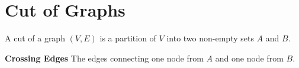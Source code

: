 \documentclass{article}
\begin{document}
	\section{Cut of Graphs}
	A cut of a graph $(V,E)$ is a partition of $V$ into two non-empty sets $A$ and $B$. 
	
	\textbf{Crossing Edges} The edges connecting one node from $A$ and one node from $B$.
	\vspace{3mm}
	
	\begin{algorithm}[H]
	\SetAlgoLined
	\caption{Problem: Minimum Cut Problem}
	
	\end{algorithm}
	\vspace{5mm}
	
\end{document}
